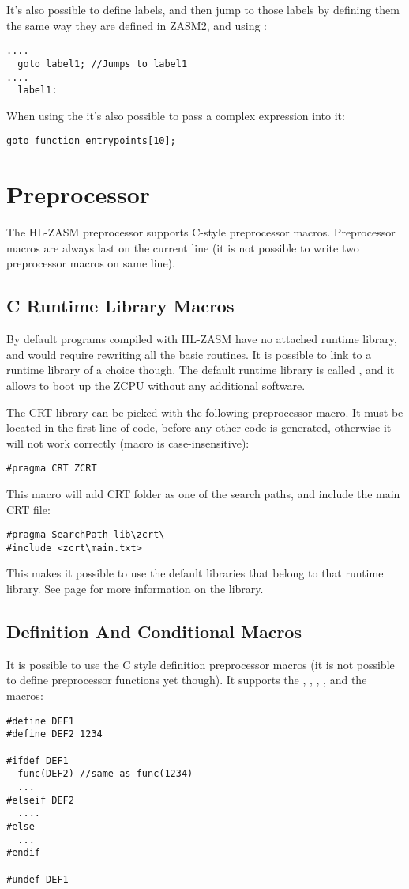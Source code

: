 It's also possible to define labels, and then jump to those labels by defining them the same way they are defined in ZASM2, and using :
\begin{verbatim}
....
  goto label1; //Jumps to label1
....
  label1:
\end{verbatim}

When using the  it's also possible to pass a complex expression into it:
\begin{verbatim}
goto function_entrypoints[10];
\end{verbatim}


\section{Preprocessor}
The HL-ZASM preprocessor supports C-style preprocessor macros. Preprocessor macros are always last on the current line (it is not possible to write two preprocessor macros on same line).

\subsection{C Runtime Library Macros} \label{crtmacro}
By default programs compiled with HL-ZASM have no attached runtime library, and would require rewriting all the basic routines. It is possible to link to a runtime library of a choice though. The default runtime library is called , and it allows to boot up the ZCPU without any additional software.

The CRT library can be picked with the following preprocessor macro. It must be located in the first line of code, before any other code is generated, otherwise it will not work correctly (macro is case-insensitive):
\begin{verbatim}
#pragma CRT ZCRT
\end{verbatim}

This macro will add CRT folder as one of the search paths, and include the main CRT file:
\begin{verbatim}
#pragma SearchPath lib\zcrt\
#include <zcrt\main.txt>
\end{verbatim}

This makes it possible to use the default libraries that belong to that runtime library. See page \pageref{zcrtlib} for more information on the  library.

\subsection{Definition And Conditional Macros}
It is possible to use the C style definition preprocessor macros (it is not possible to define preprocessor functions yet though). It supports the , , , ,  and the  macros:
\begin{verbatim}
#define DEF1
#define DEF2 1234

#ifdef DEF1
  func(DEF2) //same as func(1234)
  ...
#elseif DEF2
  ....
#else
  ...
#endif

#undef DEF1
\end{verbatim}

